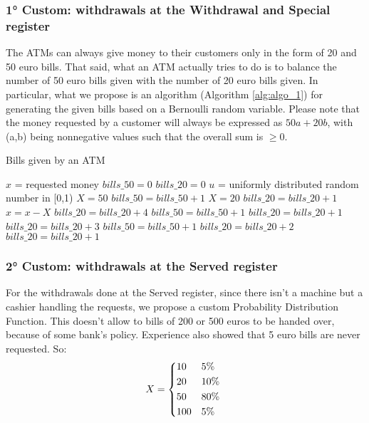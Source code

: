 \documentclass{article}
\begin{document}
\subsubsection{1° Custom: withdrawals at the Withdrawal and Special register}
The ATMs can always give money to their customers only in the form of 20 and 50 euro bills. That said, what an ATM actually tries to do is to balance the number of 50 euro bills given with the number of 20 euro bills given. In particular, what we propose is an algorithm (Algorithm \ref{alg:algo_1}) for generating the given bills based on a Bernoulli random variable. Please note that the money requested by a customer will always be expressed as $50a + 20b$, with (a,b) being nonnegative values such that the overall sum is $\geq 0$.
\begin{algorithm}
	\caption{Bills given by an ATM}
	\label{alg:algo_1}
	\begin{algorithmic}[1]
	    \State $x$ = requested money
	    \State $bills\_50 = 0$
	    \State $bills\_20 = 0$
	        \State $u$ = uniformly distributed random number in [0,1)
	            \State $X = 50$
	            \State $bills\_50 = bills\_50 + 1$
	        \Else
	            \State $X = 20$
	            \State $bills\_20 = bills\_20 + 1$
	       \EndIf
	       \State $x = x - X$
	    \EndWhile
	    \State
             \State $bills\_20 = bills\_20 + 4$
	    \EndIf
	         \State $bills\_50 = bills\_50 + 1$
             \State $bills\_20 = bills\_20 + 1$
	    \EndIf
             \State $bills\_20 = bills\_20 + 3$
	    \EndIf
	         \State $bills\_50 = bills\_50 + 1$
	    \EndIf
             \State $bills\_20 = bills\_20 + 2$
	    \EndIf
             \State $bills\_20 = bills\_20 + 1$
	    \EndIf
	\end{algorithmic} 
\end{algorithm}
\subsubsection{2° Custom: withdrawals at the Served register} \label{pdf_w_served}
For the withdrawals done at the Served register, since there isn't a machine but a cashier handling the requests, we propose a custom Probability Distribution Function. This doesn't allow to bills of 200 or 500 euros to be handed over, because of some bank's policy. Experience also showed that 5 euro bills are never requested. So:
\begin{equation*}
    X =
    \begin{cases*}
      \text{10} & $5\%$ \\
      \text{20} & $10\%$ \\
      \text{50} & $80\%$ \\
      \text{100} & $5\%$ \\
    \end{cases*}
  \end{equation*}
\end{document}
